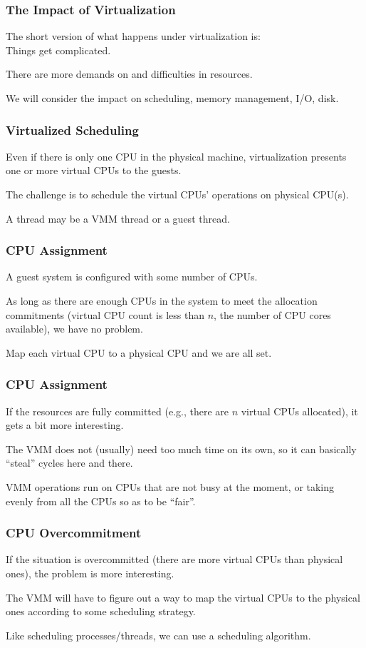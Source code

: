 \begin{frame}
\frametitle{The Impact of Virtualization}

The short version of what happens under virtualization is:\\
\quad Things get complicated. 

There are more demands on and difficulties in resources. 

We will consider the impact on scheduling, memory management, I/O, disk.

\end{frame}

\begin{frame}
\frametitle{Virtualized Scheduling}

Even if there is only one CPU in the physical machine, virtualization presents one or more virtual CPUs to the guests. 

The challenge is to schedule the virtual CPUs' operations on physical CPU(s). 

A thread may be a VMM thread or a guest thread.

\end{frame}



\begin{frame}
\frametitle{CPU Assignment}


A guest system is configured with some number of CPUs.

As long as there are enough CPUs in the system to meet the allocation commitments (virtual CPU count is less than $n$, the number of CPU cores available), we have no problem. 


Map each virtual CPU to a physical CPU and we are all set. 

\end{frame}

\begin{frame}
\frametitle{CPU Assignment}

If the resources are fully committed (e.g., there are $n$ virtual CPUs allocated), it gets a bit more interesting. 

The VMM does not (usually) need too much time on its own, so it can basically ``steal'' cycles here and there. 

VMM operations run on CPUs that are not busy at the moment, or taking evenly from all the CPUs so as to be ``fair''. 


\end{frame}

\begin{frame}
\frametitle{CPU Overcommitment}

If the situation is overcommitted (there are more virtual CPUs than physical ones), the problem is more interesting. 

The VMM will have to figure out a way to map the virtual CPUs to the physical ones according to some scheduling strategy. 

Like scheduling processes/threads, we can use a scheduling algorithm.

\end{frame}

